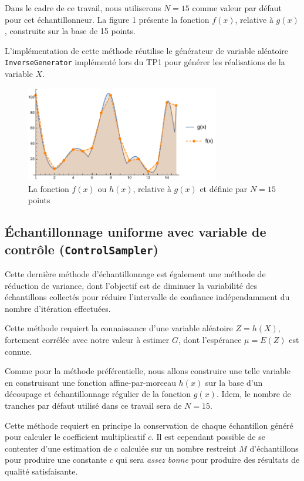 \documentclass[a4paper,11pt]{article}
\begin{document}
Dans le cadre de ce travail, nous utiliserons $N = 15$ comme valeur par défaut pour cet échantillonneur. La figure 1 présente la fonction $f(x)$, relative à $g(x)$, construite sur la base de 15 points.

L'implémentation de cette méthode réutilise le générateur de variable aléatoire \texttt{InverseGenerator} implémenté lors du TP1 pour générer les réalisations de la variable $X$.

\begin{figure}[h]
	\begin{center}
		\includegraphics[width=8.5cm]{img_graph1}
	\end{center}
	\caption{La fonction $f(x)$ ou $h(x)$, relative à $g(x)$ et définie par $N=15$ points}
\end{figure}


\subsection{Échantillonnage uniforme avec variable de contrôle {\normalfont({\tt ControlSampler})}}

Cette dernière méthode d'échantillonnage est également une méthode de réduction de variance, dont l'objectif est de diminuer la variabilité des échantillons collectés pour réduire l'intervalle de confiance indépendamment du nombre d'itération effectuées.

Cette méthode requiert la connaissance d'une variable aléatoire $Z = h(X)$, fortement corrélée avec notre valeur à estimer $G$, dont l'espérance $\mu=E(Z)$ est connue.

Comme pour la méthode préférentielle, nous allons construire une telle variable en construisant une fonction affine-par-morceau $h(x)$ sur la base d'un découpage et échantillonnage régulier de la fonction $g(x)$. Idem, le nombre de tranches par défaut utilisé dans ce travail sera de $N=15$.

Cette méthode requiert en principe la conservation de chaque échantillon généré pour calculer le coefficient multiplicatif $c$. Il est cependant possible de se contenter d'une estimation de $c$ calculée sur un nombre restreint $M$ d'échantillons pour produire une constante $c$ qui sera \emph{assez bonne} pour produire des résultats de qualité satisfaisante.
\end{document}
